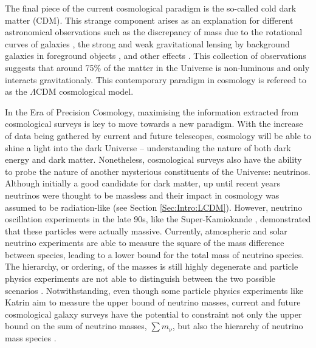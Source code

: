 \qquad The final piece of the current cosmological paradigm is the so-called cold dark matter (CDM). This strange component arises as an explanation for different astronomical observations such as the discrepancy of mass due to the rotational curves of galaxies \citep{1970Rubin}, the strong and weak gravitational lensing by background galaxies in foreground objects \citep{2006BulletCluster}, and other effects \citep[see][for a detailed review]{DarkMatterReview1993}. This collection of observations suggests that around 75\% of the matter in the Universe is non-luminous and only interacts gravitationaly. This contemporary paradigm in cosmology is refereed to as the $\Lambda$CDM cosmological model.

\qquad In the Era of Precision Cosmology, maximising the information extracted from cosmological surveys is key to move towards a new paradigm. With the increase of data being gathered by current and future telescopes, cosmology will be able to shine a light into the dark Universe -- understanding the nature of both dark energy and dark matter. Nonetheless, cosmological surveys also have the ability to probe the nature of another mysterious constituents of the Universe: neutrinos. Although initially a good candidate for dark matter, up until recent years neutrinos were thought to be massless and their impact in cosmology was assumed to be radiation-like (see Section \ref{Sec:Intro:LCDM}). However, neutrino oscillation experiments in the late 90s, like the Super-Kamiokande \citep{Kamiokande1998}, demonstrated that these particles were actually massive. Currently, atmospheric and solar neutrino experiments are able to measure the square of the mass difference between species, leading to a lower bound for the total mass of neutrino species. The hierarchy, or ordering, of the masses is still highly degenerate and particle physics experiments are not able to distinguish between the two possible scenarios \citep{2014Gonzalez-GarciaNeutrino}. Notwithstanding, even though some particle physics experiments like Katrin \citep{2018Katrin} aim to measure the upper bound of neutrino masses, current and future cosmological galaxy surveys have the potential to constraint not only the upper bound on the sum of neutrino masses, $\sum m_{\nu}$, but also the hierarchy of neutrino mass species \citep{2003HannestadNeutrino, 2007FBA,2016JCAP...11..035H}.


